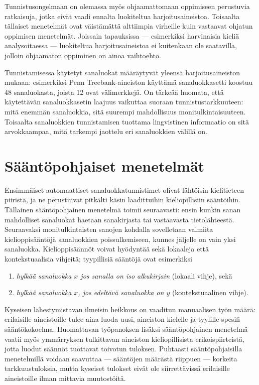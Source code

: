 \documentclass[utf8,bachelor,manualbib]{gradu3}
\begin{document}
Tunnistusongelmaan on olemassa myös ohjaamattomaan oppimiseen perustuvia ratkaisuja, jotka eivät vaadi ennalta luokiteltua harjoitusaineistoa. Toisaalta tällaiset menetelmät ovat väistämättä alttiimpia virheille kuin vastaavat ohjatun oppimisen menetelmät. Joissain tapauksissa --- esimerkiksi harvinaisia kieliä analysoitaessa --- luokiteltua harjoitusaineistoa ei kuitenkaan ole saatavilla, jolloin ohjaamaton oppiminen on ainoa vaihtoehto.

Tunnistamisessa käytetyt sanaluokat määräytyvät yleensä harjoitusaineiston mukaan: esimerkiksi Penn Treebank-aineiston käyttämä sanaluokkasetti koostuu 48 sanaluokasta, joista 12 ovat välimerkkejä. On tärkeää huomata, että käytettävän sanaluokkasetin laajuus vaikuttaa suoraan tunnistustarkkuuteen: mitä enemmän sanaluokkia, sitä suurempi mahdollisuus monitulkintaisuuteen. Toisaalta sanaluokkien tunnistamisen tuottama lingvistinen informaatio on sitä arvokkaampaa, mitä tarkempi jaottelu eri sanaluokkien välillä on. \citep{marcus1993}

\chapter{Sääntöpohjaiset menetelmät}

Ensimmäiset automaattiset sanaluokkatunnistimet \citep[mm.][]{greene1971} olivat lähtöisin kielitieteen piiristä, ja ne perustuivat pitkälti käsin laadittuihin kieliopillisiin sääntöihin. Tällainen sääntöpohjainen menetelmä toimii seuraavasti: ensin kunkin sanan mahdolliset sanaluokat haetaan sanakirjasta tai vastaavasta tietolähteestä. Seuraavaksi monitulkintaisten sanojen kohdalla sovelletaan valmiita kielioppisääntöjä sanaluokkien poissulkemiseen, kunnes jäljelle on vain yksi sanaluokka. Kielioppisäännöt voivat hyödyntää sekä lokaaleja että kontekstuaalisia vihjeitä; tyypillisiä sääntöjä ovat esimerkiksi

\begin{enumerate}
\item \textit{hylkää sanaluokka $x$ jos sanalla on iso alkukirjain} (lokaali vihje), sekä
\item \textit{hylkää sanaluokka $x$, jos edeltävä sanaluokka on $y$} (kontekstuaalinen vihje).
\end{enumerate}

Kyseisen lähestymistavan ilmeisin heikkous on vaaditun manuaalisen työn määrä: erilaisille aineistoille tulee aina luoda uusi, aineiston kielelle ja tyylille spesifi sääntökokoelma. Huomattavan työpanoksen lisäksi sääntöpohjainen menetelmä vaatii myös ymmärryksen tulkittavan aineiston kieliopillisista erikoispiirteistä, jotta luodut säännöt tuottavat toivotun tuloksen. Puhtaasti sääntöpohjaisilla menetelmillä voidaan saavuttaa --- sääntöjen määrästä riippuen --- korkeita tarkkuustuloksia, mutta kyseiset tulokset eivät ole siirrettävissä erilaisille aineistoille ilman mittavia muutostöitä.
\end{document}
